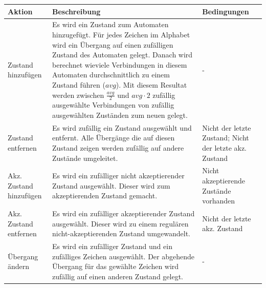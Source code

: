 \begin{center}
  \begin{tabular}{| l | p{7cm} | p{4cm} |}
    \hline
    \textbf{Aktion} &  \textbf{Beschreibung} & \textbf{Bedingungen}\\
    \hline
    Zustand hinzufügen 
    & Es wird ein Zustand zum Automaten hinzugefügt. Für jedes Zeichen im Alphabet wird ein Übergang auf einen zufälligen Zustand des Automaten gelegt. Danach wird berechnet wieviele Verbindungen in diesem Automaten durchschnittlich zu einem Zustand führen ($avg$). Mit diesem Resultat werden zwischen $\frac{avg}{2}$ und $avg \cdot 2$ zufällig ausgewählte Verbindungen von zufällig ausgewählten Zuständen zum neuen gelegt.
    & - \\
    \hline
    Zustand entfernen
    & Es wird zufällig ein Zustand ausgewählt und entfernt. Alle Übergänge die auf diesen Zustand zeigen werden zufällig auf andere Zustände umgeleitet.
    & Nicht der letzte Zustand; Nicht der letzte akz. Zustand \\
    \hline
    Akz. Zustand hinzufügen
    & Es wird ein zufälliger nicht akzeptierender Zustand ausgewählt. Dieser wird zum akzeptierenden Zustand gemacht.
    & Nicht akzeptierende Zustände vorhanden \\
    \hline
    Akz. Zustand entfernen
    & Es wird ein zufälliger akzeptierender Zustand ausgewählt. Dieser wird zu einem regulären nicht-akzeptierenden Zustand umgewandelt.
    & Nicht der letzte akz. Zustand \\
    \hline
    Übergang ändern
    & Es wird ein zufälliger Zustand und ein zufälliges Zeichen ausgewählt. Der abgehende Übergang für das gewählte Zeichen wird zufällig auf einen anderen Zustand gelegt.
    & - \\
    \hline 
  \end{tabular}
\end{center}


